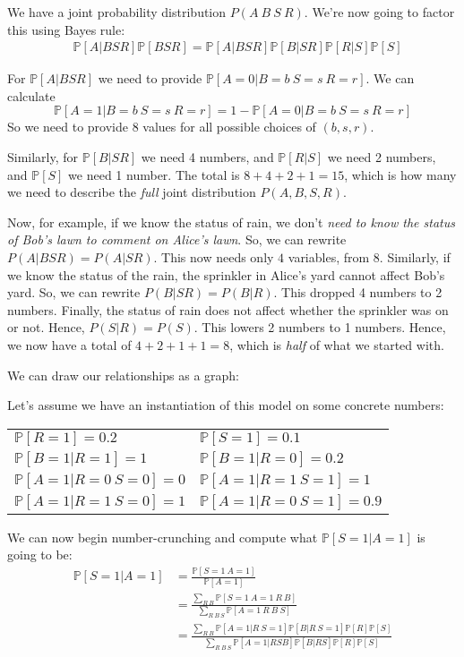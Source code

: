 \documentclass[11pt]{book}
\renewcommand{\P}[1]{\ensuremath{\mathbb{P} \left[ #1 \right]}}
\begin{document}
We have a joint probability distribution $P(A~ B~ S~ R)$. 
We're now going to factor this using Bayes rule:
\begin{align*}
    &\P{A|BSR} \P{BSR} = \P{A|BSR} \P{B |SR} \P{R|S} \P{S}
\end{align*}

For $\P{A|BSR}$ we need to provide $\P{A=0|B=b~ S=s~ R=r}$. We can calculate
$$\P{A=1|B=b~S=s~R=r} = 1 - \P{A=0|B=b~ S=s~ R=r}$$ So we need to provide $8$ values
for all possible choices of $(b, s, r)$.

Similarly, for $\P{B|SR}$ we need 4 numbers, and $\P{R|S}$ we need 2 numbers,
and $\P{S}$ we need 1 number. The total is $8 + 4 + 2 + 1 = 15$, which is how many
we need to describe the \emph{full} joint distribution $P(A, B, S, R)$.

Now, for example, if we know the status of rain, we don't \emph{need to know the status
of Bob's lawn to comment on Alice's lawn}. So, we can rewrite $P(A|BSR) = P(A|SR)$.
This now needs only $4$ variables, from $8$.
Similarly, if we know the status of the rain, the sprinkler in Alice's yard
cannot affect Bob's yard. So, we can rewrite $P(B|SR) = P(B|R)$. This dropped
4 numbers to 2 numbers.
Finally, the status of rain does not affect whether the sprinkler was on
or not. Hence, $P(S|R) = P(S)$. This lowers 2 numbers to 1 numbers.
Hence, we now have a total of $4 + 2 + 1 + 1 = 8$, which is \emph{half} of
what we started with.

We can draw our relationships as a graph:

\begin{tikzpicture}
\end{tikzpicture}


Let's assume we have an instantiation of this model on some concrete numbers:

\begin{tabular}{ll}
    $\P{R=1} = 0.2$ &   $\P{S=1} = 0.1$ \\
    $\P{B=1|R=1} = 1$ & $\P{B=1|R=0} = 0.2$ \\
    $\P{A=1|R=0~S=0} = 0$ & $\P{A=1|R=1~S=1} = 1$  \\
    $\P{A=1|R=1~S=0} = 1$ & $\P{A=1|R=0~S=1} = 0.9$ \\
\end{tabular}


We can now begin number-crunching and compute what $\P{S=1|A=1}$ is going
to be:
\begin{align*}
\P{S=1|A=1} &= \frac{\P{S=1~A=1}}{\P{A=1}} \\
&= \frac{\sum_{R~ B} \P{S=1~ A=1~ R~ B}}{\sum_{R~ B~ S} \P{A=1~ R~ B~ S}} \\
&= \frac{\sum_{R~ B} \P{A=1 |R~ S=1}\P{B | R~ S=1} \P{R} \P{S}}{\sum_{R~ B~ S} \P{A=1|RSB} \P{B|RS} \P{R} \P{S}}
\end{align*}
\end{document}
